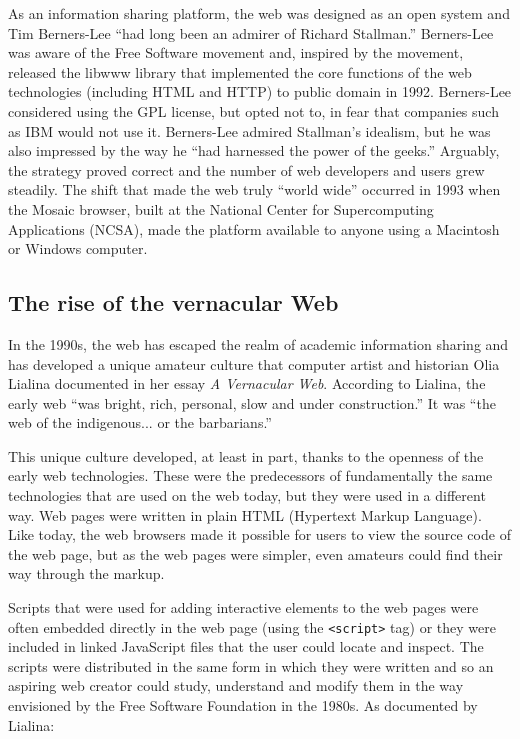 As an information sharing platform, the web was designed as an open system
and Tim Berners-Lee ``had long been an admirer of Richard Stallman.''
Berners-Lee was aware of the Free Software movement and, inspired by the movement, released
the libwww library that implemented the core functions of the web technologies (including HTML
and HTTP) to public domain in 1992. Berners-Lee considered using the GPL license, but opted not
to, in fear that companies such as IBM would not use it.
Berners-Lee admired Stallman's idealism, but he was also impressed
by the way he ``had harnessed the power of the geeks.''
Arguably, the strategy proved correct and the number of web developers and users grew steadily.
The shift that made the web truly ``world wide'' occurred in 1993 when the Mosaic browser,
built at the National Center for Supercomputing Applications (NCSA), made the platform
available to anyone using a Macintosh or Windows computer.

\subsection{The rise of the vernacular Web}

In the 1990s, the web has escaped the realm of academic information sharing and
has developed a unique amateur culture that computer artist and historian Olia Lialina
documented in her essay \emph{A Vernacular Web}.
According to Lialina, the early web ``was bright, rich, personal, slow and under construction.''
It was ``the web of the indigenous... or the barbarians.''

This unique culture developed, at least in part, thanks to the openness of the early web
technologies. These were the predecessors of fundamentally the same
technologies that are used on the web today, but they were used in a different way.
Web pages were written in plain HTML (Hypertext Markup Language). Like today, the web browsers
made it possible for users to view the source code of the web page, but as the web pages
were simpler, even amateurs could find their way through the markup.

Scripts that were used for adding interactive elements to the web pages were often embedded directly
in the web page (using the \texttt{<script>} tag) or they were included in linked JavaScript files
that the user could locate and inspect. The scripts were distributed in the same form in which they
were written and so an aspiring web creator could study, understand and modify them in the way
envisioned by the Free Software Foundation in the 1980s. As documented by Lialina:

